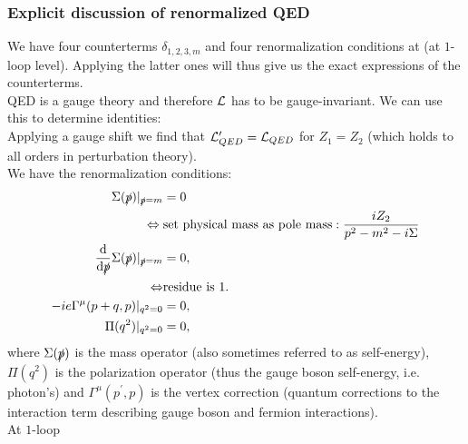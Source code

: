 \subsubsection{Explicit discussion of renormalized QED}
We have four counterterms $\delta_{1,2,3,m}$ and four renormalization conditions at (at $1$-loop level). Applying the latter ones will thus give us the exact expressions of the counterterms.\\
QED is a gauge theory and therefore $\mathcal{L}$ has to be gauge-invariant. We can use this to determine identities:\\
Applying a gauge shift we find that $\mathcal{L}^\prime_{QED}=\mathcal{L}_{QED}$ for $Z_1=Z_2$ (which holds to all orders in perturbation theory).\\
We have the renormalization conditions:
\begin{align}
	\Sigma(\slashed{p})|_{\slashed{p}=m} &=0 \\
	\Leftrightarrow\; &\text{set physical mass as pole mass}: \frac{i Z_2}{p^2-m^2-i\Sigma}\nonumber\\
	\frac{\mathrm{d}}{\mathrm{d} \slashed{p}} \Sigma(\slashed{p}) |_{\slashed{p}=m} &= 0,\\
	\Leftrightarrow &\text{residue is }1.\nonumber\\
	-ie \Gamma^\mu(p+q,p) |_{q^2=0} &=0,\\
	\Pi(q^2)|_{q^2=0} &=0,
\end{align}
where $\Sigma(\slashed{p})$ is the mass operator (also sometimes referred to as self-energy), $\Pi(q ^2)$ is the polarization operator (thus the gauge boson self-energy, i.e. photon's) and $\Gamma^\mu(p^\prime,p)$ is the vertex correction (quantum corrections to the interaction term describing gauge boson and fermion interactions).\\
At $1$-loop
